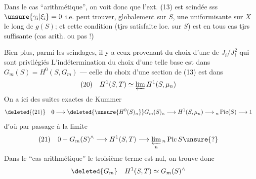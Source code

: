 Dans le cas ``arithmétique'', on voit donc que l'ext. (13) est scindée sss $\unsure{\gamma_i|\xi_i}=0$ i.e.  peut trouver, globalement sur $S$, une uniformisante sur $X$ le long de $g(S)$; et cette condition (tjrs satisfaite loc. sur $S$) est en tous cas tjrs suffisante (cas arith. ou pas !)

Bien plus, parmi les scindages, il y a ceux provenant du choix d'une  de $J_i/J_i^2$ qui sont privilégiés L'indétermination du choix d'une telle base est dans $G_m(S)=H^0(S,G_m)$ --- celle du choix d'une section de (13) est dans
\[
(20)\quad H^1(S,T)\simeq\varprojlim H^1(S,\mu_n)
\]
On a ici des suites exactes de Kummer
\[
\deleted{(21)}\quad 0\longrightarrow\deleted{\unsure{H^0(S)_n}}G_m(S)_n\longrightarrow H^1(S,\mu_n)\longrightarrow{}_n\operatorname{Pic}(S)\longrightarrow1
\]
d'où par passage à la limite
\[
(21)\quad 0-G_m(S)^\wedge\longrightarrow H^1(S,T)\longrightarrow\varprojlim_n{}_n\operatorname{Pic}S\unsure{?}
\]
Dans le ``cas arithmétique'' le troisième terme est nul, on trouve donc
\[
\deleted{G_m}\quad H^1(S,T)\simeq G_m(S)^\wedge
\]
